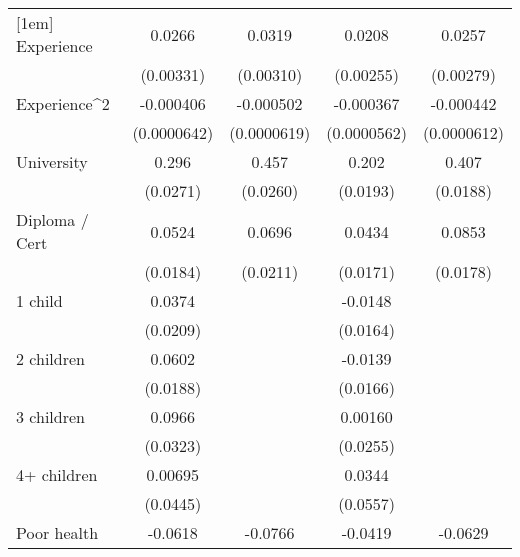 {\begin{tabular}{l*{4}{c}}
[1em]
Experience          &      0.0266\sym{***}&      0.0319\sym{***}&      0.0208\sym{***}&      0.0257\sym{***}\\
                    &   (0.00331)         &   (0.00310)         &   (0.00255)         &   (0.00279)         \\
[1em]
Experience^{2}      &   -0.000406\sym{***}&   -0.000502\sym{***}&   -0.000367\sym{***}&   -0.000442\sym{***}\\
                    & (0.0000642)         & (0.0000619)         & (0.0000562)         & (0.0000612)         \\
[1em]
University          &       0.296\sym{***}&       0.457\sym{***}&       0.202\sym{***}&       0.407\sym{***}\\
                    &    (0.0271)         &    (0.0260)         &    (0.0193)         &    (0.0188)         \\
[1em]
Diploma / Cert      &      0.0524\sym{**} &      0.0696\sym{***}&      0.0434\sym{*}  &      0.0853\sym{***}\\
                    &    (0.0184)         &    (0.0211)         &    (0.0171)         &    (0.0178)         \\
[1em]
1 child             &      0.0374         &                     &     -0.0148         &                     \\
                    &    (0.0209)         &                     &    (0.0164)         &                     \\
[1em]
2 children          &      0.0602\sym{**} &                     &     -0.0139         &                     \\
                    &    (0.0188)         &                     &    (0.0166)         &                     \\
[1em]
3 children          &      0.0966\sym{**} &                     &     0.00160         &                     \\
                    &    (0.0323)         &                     &    (0.0255)         &                     \\
[1em]
4+ children         &     0.00695         &                     &      0.0344         &                     \\
                    &    (0.0445)         &                     &    (0.0557)         &                     \\
[1em]
Poor health         &     -0.0618\sym{***}&     -0.0766\sym{***}&     -0.0419\sym{**} &     -0.0629\sym{***}\\

\end{tabular}}

